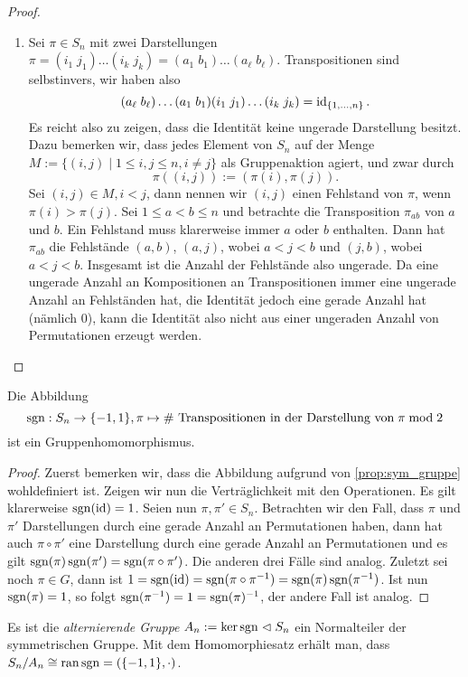 \begin{proof}{\ }
\begin{enumerate}
        \item Sei $\pi \in S_n$ mit zwei Darstellungen $\pi = (i_1\; j_1) \hdots (i_k\; j_k) = (a_1\; b_1) \hdots (a_\ell\; b_\ell)$. Transpositionen sind selbstinvers, wir haben also
        $$ (a_\ell\; b_\ell) \hdots (a_1\; b_1) (i_1\; j_1) \hdots (i_k\; j_k) = \operatorname{id}_{\{1,\hdots,n\}}. $$
        Es reicht also zu zeigen, dass die Identität keine ungerade Darstellung besitzt. Dazu bemerken wir, dass jedes Element von $S_n$ auf der Menge $M := \{ (i, j) \mid 1 \leq i, j \leq n, i \neq j \}$ als Gruppenaktion agiert, und zwar durch
        $$ \pi((i, j)) := (\pi(i), \pi(j)). $$
        Sei $(i, j) \in M, i < j$, dann nennen wir $(i,j)$ einen Fehlstand von $\pi$, wenn $\pi(i) > \pi(j)$. Sei $1 \leq a < b \leq n$ und betrachte die Transposition $\pi_{ab}$ von $a$ und $b$. Ein Fehlstand muss klarerweise immer $a$ oder $b$ enthalten. Dann hat $\pi_{ab}$ die Fehlstände $(a, b)$, $(a, j)$, wobei $a < j < b$ und $(j, b)$, wobei $a < j < b$. Insgesamt ist die Anzahl der Fehlstände also ungerade. Da eine ungerade Anzahl an Kompositionen an Transpositionen immer eine ungerade Anzahl an Fehlständen hat, die Identität jedoch eine gerade Anzahl hat (nämlich 0), kann die Identität also nicht aus einer ungeraden Anzahl von Permutationen erzeugt werden.
    \end{enumerate}
\end{proof}

\begin{corollary}
    Die Abbildung $$\operatorname{sgn}: S_n \to \{-1,1\}, \pi \mapsto \text{\# Transpositionen in der Darstellung von}\;\pi\;\text{mod}\; 2$$ ist ein Gruppenhomomorphismus.
\end{corollary}
\begin{proof}
    Zuerst bemerken wir, dass die Abbildung aufgrund von \cref{prop:sym_gruppe} wohldefiniert ist. Zeigen wir nun die Verträglichkeit mit den Operationen. Es gilt klarerweise $\operatorname{sgn}(\operatorname{id}) = 1$. Seien nun $\pi, \pi' \in S_n$. Betrachten wir den Fall, dass $\pi$ und $\pi'$ Darstellungen durch eine gerade Anzahl an Permutationen haben, dann hat auch $\pi \circ \pi'$ eine Darstellung durch eine gerade Anzahl an Permutationen und es gilt $\operatorname{sgn}(\pi)\operatorname{sgn}(\pi') = \operatorname{sgn}(\pi \circ \pi')$. Die anderen drei Fälle sind analog. Zuletzt sei noch $\pi \in G$, dann ist $1 = \operatorname{sgn}(\operatorname{id}) = \operatorname{sgn}(\pi \circ \pi^{-1}) = \operatorname{sgn}(\pi) \operatorname{sgn}(\pi^{-1})$. Ist nun $\operatorname{sgn}(\pi) = 1$, so folgt $\operatorname{sgn}(\pi^{-1}) = 1 = \operatorname{sgn}(\pi)^{-1}$, der andere Fall ist analog.
\end{proof}

\begin{remark}
    Es ist die \emph{alternierende Gruppe} $A_n := \ker \operatorname{sgn} \vartriangleleft S_n$ ein Normalteiler der symmetrischen Gruppe. Mit dem Homomorphiesatz erhält man, dass $S_n/A_n \cong \operatorname{ran} \operatorname{sgn} = (\{-1,1\}, \cdot)$.
\end{remark}

